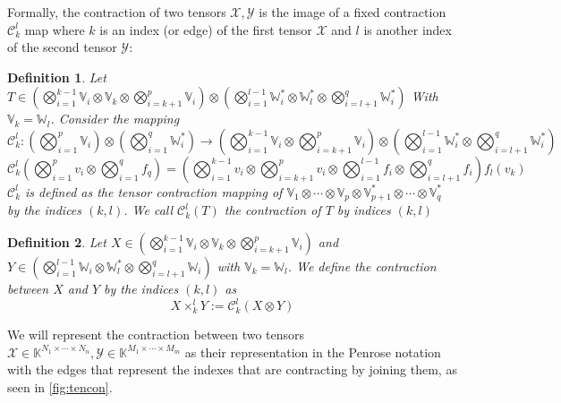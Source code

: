 \documentclass[11pt,a4paper,openright,oneside]{book}
\numberwithin{equation}{section}
\newtheorem{defn0}{Definition}[chapter]
\newenvironment{definition}{ \begin{defn0}}{\end{defn0}}
\newcommand{\figref}[1]{\cref{#1}}
\begin{document}
Formally, the contraction of two tensors $\mathcal{X}, \mathcal{Y}$ is the image of a fixed contraction $\mathcal{C}_k^l$ map where $k$ is an index (or edge) of the first tensor $\mathcal{X}$ and $l$
is another index of the second tensor $\mathcal{Y}$:

\begin{definition}
    Let $T \in \left( \bigotimes_{i=1}^{k-1} \mathbb{V}_i \otimes \mathbb{V}_k \otimes \bigotimes_{i=k+1}^{p} \mathbb{V}_i \right) \otimes 
    \left( \bigotimes_{i=1}^{l-1} \mathbb{W}_{i}^* \otimes \mathbb{W}_l^* \otimes 
    \bigotimes_{i=l+1}^q \mathbb{W}_i^* \right)$ With $\mathbb{V}_k = \mathbb{W}_l$. Consider the mapping
    $$
    \mathcal{C}_k^l: 
    \left(\bigotimes_{i=1}^{p} \mathbb{V}_i \right) \otimes \left( \bigotimes_{i=1}^{q} \mathbb{W}_i^* \right) \longrightarrow 
    \left( \bigotimes_{i=1}^{k-1} \mathbb{V}_i \otimes \bigotimes_{i=k+1}^p \mathbb{V}_i \right) \otimes \left( \bigotimes_{i=1}^{l-1} \mathbb{W}^*_i \otimes \bigotimes_{i=l+1}^q \mathbb{W}^*_i \right)
$$
$$
\mathcal{C}_k^l \left( \bigotimes\nolimits_{i=1}^p v_i \otimes \bigotimes\nolimits_{i=1}^q f_q \right) 
= \left(\bigotimes\nolimits_{i=1}^{k-1} v_i \otimes \bigotimes\nolimits_{i=k+1}^p v_{i} \otimes
    \bigotimes\nolimits_{i=1}^{l-1} f_i \otimes \bigotimes_{i=l+1}^q f_i \right) f_l(v_k)$$
$\mathcal{C}_k^l$ is defined as the tensor contraction mapping of $\mathbb{V}_1 \otimes \cdots \otimes \mathbb{V}_p \otimes \mathbb{V}_{p+1}^* \otimes
\cdots \otimes \mathbb{V}_q^*$ by the indices $(k,l)$. We call $\mathcal{C}_k^l(T)$ the contraction of $T$ by indices $(k,l)$
\end{definition}

\begin{definition}

    Let $X \in \left( \bigotimes_{i=1}^{k-1} \mathbb{V}_i \otimes \mathbb{V}_k \otimes \bigotimes_{i=k+1}^{p} \mathbb{V}_i \right)$ and
    $Y \in \left( \bigotimes_{i=1}^{l-1} \mathbb{W}_{i} \otimes \mathbb{W}_l^* \otimes 
    \bigotimes_{i=l+1}^q \mathbb{W}_i \right)$ with $\mathbb{V}_k = \mathbb{W}_l$. We define the contraction between $X$ and $Y$ by the
    indices $(k,l)$ as $$X \times^l_k Y := \mathcal{C}_k^l(X \otimes Y)$$
\end{definition}

We will represent the contraction between two tensors $\mathcal{X} \in \mathbb{K}^{N_1 \times \cdots \times N_n}, \mathcal{Y} \in \mathbb{K}^{M_1 \times \cdots \times M_m}$
as their representation in the Penrose notation with the edges that represent the indexes that are contracting by joining them, as seen in \figref{fig:tencon}.
\end{document}
